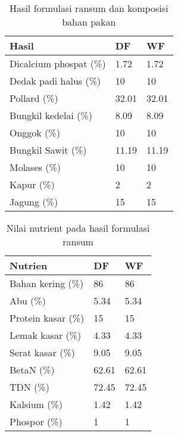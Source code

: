 \begin{table}[h!]
	\centering
	\caption{Hasil formulasi ransum dan komposisi bahan pakan}
	\label{my-label}
	\begin{tabular}{p{3.5cm}p{0.75cm}p{0.75cm}}
		\hline
		Hasil                   & DF    & WF    \\ \hline
		Dicalcium  phospat (\%) & 1.72  & 1.72  \\
		Dedak padi halus (\%)   & 10    & 10    \\
		Pollard (\%)            & 32.01 & 32.01 \\
		Bungkil kedelai (\%)    & 8.09  & 8.09  \\
		Onggok (\%)             & 10    & 10    \\
		Bungkil Sawit (\%)      & 11.19 & 11.19 \\
		Molases (\%)            & 10    & 10    \\
		Kapur (\%)              & 2     & 2     \\
		Jagung (\%)             & 15    & 15 	\\ \hline
	\end{tabular}
\end{table}

\begin{table}[h!]
	\centering
	\caption{Nilai nutrient pada hasil formulasi ransum}
	\label{my-label}
	\begin{tabular}{p{3.5cm}p{0.75cm}p{0.75cm}}
		\hline
		Nutrien            & DF    & WF    \\ \hline
		Bahan kering (\%)  & 86    & 86    \\
		Abu (\%)           & 5.34  & 5.34  \\
		Protein kasar (\%) & 15    & 15    \\
		Lemak kasar (\%)   & 4.33  & 4.33  \\
		Serat kasar (\%)   & 9.05  & 9.05  \\
		BetaN (\%)         & 62.61 & 62.61 \\
		TDN (\%)           & 72.45 & 72.45 \\
		Kalsium (\%)       & 1.42  & 1.42  \\
		Phospor (\%)       & 1     & 1 	   \\ \hline
	\end{tabular}
\end{table}

